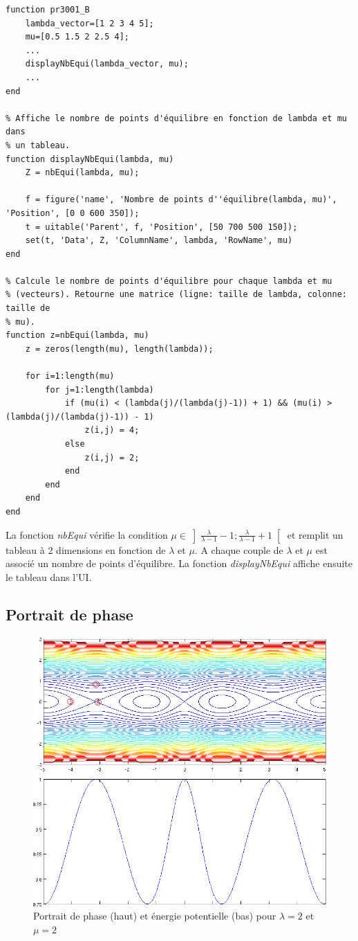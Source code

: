 \documentclass[11pt]{article}
\begin{document}
\begin{lstlisting}
function pr3001_B
	lambda_vector=[1 2 3 4 5];
	mu=[0.5 1.5 2 2.5 4];
	...
	displayNbEqui(lambda_vector, mu);
	...
end

% Affiche le nombre de points d'équilibre en fonction de lambda et mu dans
% un tableau.
function displayNbEqui(lambda, mu)
    Z = nbEqui(lambda, mu);

    f = figure('name', 'Nombre de points d''équilibre(lambda, mu)', 'Position', [0 0 600 350]);
    t = uitable('Parent', f, 'Position', [50 700 500 150]);
    set(t, 'Data', Z, 'ColumnName', lambda, 'RowName', mu)
end

% Calcule le nombre de points d'équilibre pour chaque lambda et mu
% (vecteurs). Retourne une matrice (ligne: taille de lambda, colonne: taille de
% mu).
function z=nbEqui(lambda, mu)
    z = zeros(length(mu), length(lambda));

    for i=1:length(mu)
        for j=1:length(lambda)
            if (mu(i) < (lambda(j)/(lambda(j)-1)) + 1) && (mu(i) > (lambda(j)/(lambda(j)-1)) - 1)
                z(i,j) = 4;
            else
                z(i,j) = 2;
            end
        end
    end
end
\end{lstlisting}
La fonction \emph{nbEqui} vérifie la condition $\displaystyle \mu \in \left] \frac{\lambda}{\lambda - 1}-1 ; \frac{\lambda}{\lambda - 1}+1 \right[$ et remplit un tableau à 2 dimensions en fonction de $\lambda$ et $\mu$. A chaque couple de $\lambda$ et $\mu$ est associé un nombre de points d'équilibre. La fonction \emph{displayNbEqui} affiche ensuite le tableau dans l'UI.

\newpage
\subsection{Portrait de phase}
\begin{figure}[h!]
	\centering
	\includegraphics[scale=0.55]{Figures/rapport_figportraitphasemu2.png}
	\caption{Portrait de phase (haut) et énergie potentielle (bas) pour $\lambda=2$ et $\mu=2$}
	\label{fig:pp_ep_mu2}
\end{figure}
\end{document}
